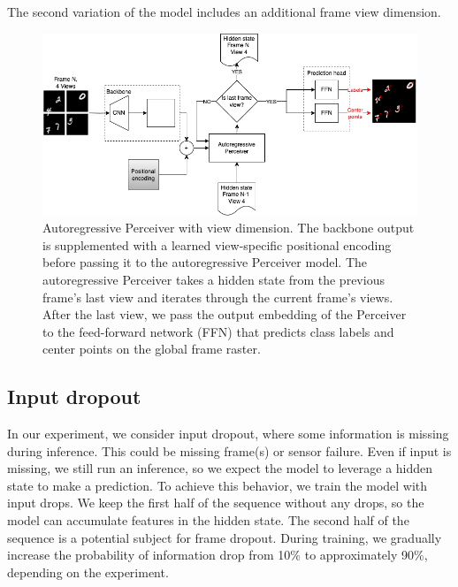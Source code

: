The second variation of the model includes an additional frame view dimension.

\begin{figure}
    \centering
    \includegraphics[width=\textwidth]{figures/figure_methods_model_ar_perceiver_views.png}
    \caption{Autoregressive Perceiver with view dimension. The backbone output is supplemented with a learned view-specific positional encoding before passing it to the autoregressive Perceiver model. The autoregressive Perceiver takes a hidden state from the previous frame's last view and iterates through the current frame's views. After the last view, we pass the output embedding of the Perceiver to the feed-forward network (FFN) that predicts class labels and center points on the global frame raster.}
    \label{fig:figure_methods_model_ar_perceiver_views}
\end{figure}



\subsection{Input dropout}

In our experiment, we consider input dropout, where some information is missing during inference. This could be missing frame(s) or sensor failure. Even if input is missing, we still run an inference, so we expect the model to leverage a hidden state to make a prediction.
To achieve this behavior, we train the model with input drops. We keep the first half of the sequence without any drops, so the model can accumulate features in the hidden state. The second half of the sequence is a potential subject for frame dropout. During training, we gradually increase the probability of information drop from 10\% to approximately 90\%, depending on the experiment.